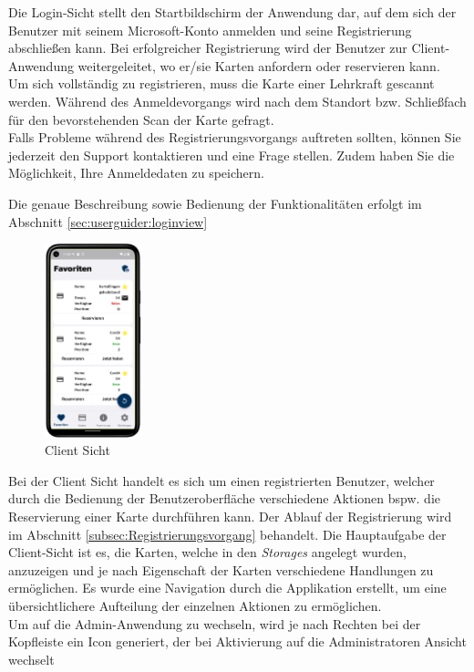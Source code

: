 Die Login-Sicht stellt den Startbildschirm der Anwendung dar, auf dem sich der Benutzer mit seinem Microsoft-Konto anmelden und seine Registrierung abschließen kann. Bei erfolgreicher Registrierung wird der Benutzer zur Client-Anwendung weitergeleitet, wo er/sie Karten anfordern oder reservieren kann. 
\\
Um sich vollständig zu registrieren, muss die Karte einer Lehrkraft gescannt werden. Während des Anmeldevorgangs wird nach dem Standort bzw. Schlie\ss fach für den bevorstehenden Scan der Karte gefragt.\\

Falls Probleme während des Registrierungsvorgangs auftreten sollten, können Sie jederzeit den Support kontaktieren und eine Frage stellen. Zudem haben Sie die Möglichkeit, Ihre Anmeldedaten zu speichern.

Die genaue Beschreibung sowie Bedienung der Funktionalitäten erfolgt im Abschnitt \ref{sec:userguider:loginview}



\newpage

\label{subsec:thero:client}
\begin{figure}
\centering
    \includegraphics[width=0.25\textwidth]{FLUTTER/images/GP/Client_Karten.png}
    \caption{Client Sicht}
\end{figure}

Bei der Client Sicht handelt es sich um einen registrierten Benutzer, welcher durch die Bedienung der Benutzeroberfläche verschiedene Aktionen bspw. die Reservierung einer Karte durchführen kann. Der Ablauf der Registrierung wird im Abschnitt \ref{subsec:Registrierungsvorgang}  behandelt. 
Die Hauptaufgabe der Client-Sicht ist es, die Karten, welche in den {\textit{Storages}} angelegt wurden, anzuzeigen und je nach Eigenschaft der Karten verschiedene Handlungen zu ermöglichen. Es wurde eine Navigation durch die Applikation erstellt, um eine übersichtlichere Aufteilung der einzelnen Aktionen zu ermöglichen.\\
Um auf die Admin-Anwendung zu wechseln, wird je nach Rechten bei der Kopfleiste ein Icon generiert, der bei Aktivierung auf die Administratoren Ansicht wechselt

